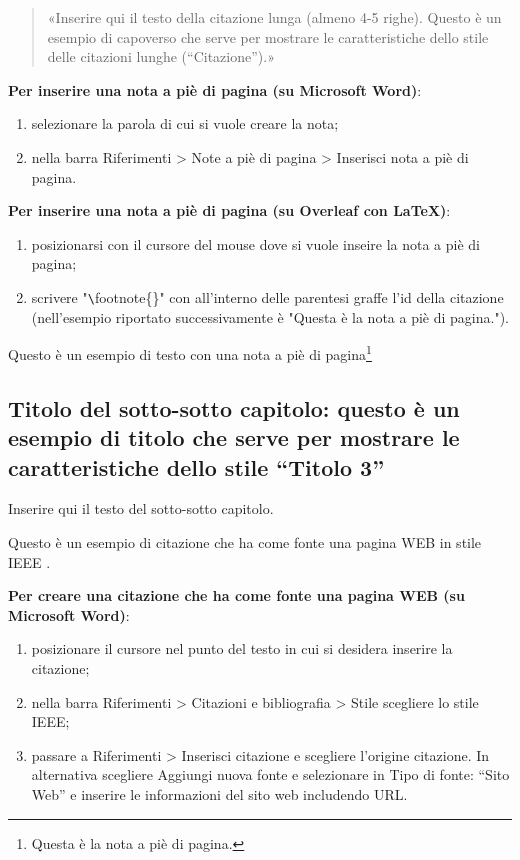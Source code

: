 \begin{quote}
    «Inserire qui il testo della citazione lunga (almeno 4-5 righe). Questo è un esempio di capoverso che serve per mostrare le caratteristiche dello stile delle citazioni lunghe (“Citazione”).»
\end{quote}



\noindent \textbf{Per inserire una nota a piè di pagina (su Microsoft Word)}:
\begin{enumerate}
    \item selezionare la parola di cui si vuole creare la nota; 
    \item nella barra Riferimenti > Note a piè di pagina > Inserisci nota a piè di pagina.
\end{enumerate}

\noindent \textbf{Per inserire una nota a piè di pagina (su Overleaf con LaTeX)}:
\begin{enumerate}
    \item posizionarsi con il cursore del mouse dove si vuole inseire la nota a piè di pagina;
    \item scrivere "\verb|\|footnote\{\}" con all'interno delle parentesi graffe l'id della citazione (nell'esempio riportato successivamente è "Questa è la nota a piè di pagina.").
\end{enumerate}

Questo è un esempio di testo con una nota a piè di pagina\footnote{Questa è la nota a piè di pagina.}

\subsection{Titolo del sotto-sotto capitolo: questo è un esempio di titolo che serve per mostrare le caratteristiche dello stile “Titolo 3”}

Inserire qui il testo del sotto-sotto capitolo.

Questo è un esempio di citazione che ha come fonte una pagina WEB in stile IEEE \cite{id2}. 

\textbf{Per creare una citazione che ha come fonte una pagina WEB (su Microsoft Word)}:
\begin{enumerate}
    \item posizionare il cursore nel punto del testo in cui si desidera inserire la citazione;
    \item nella barra Riferimenti > Citazioni e bibliografia > Stile scegliere lo stile IEEE;
    \item passare a Riferimenti > Inserisci citazione e scegliere l’origine citazione. In alternativa scegliere Aggiungi nuova fonte e selezionare in Tipo di fonte: “Sito Web” e inserire le informazioni del sito web includendo URL.
\end{enumerate} 

